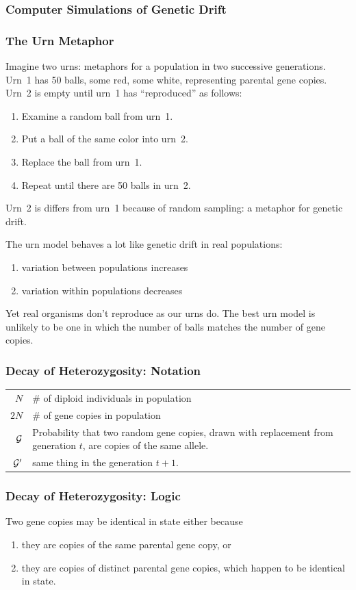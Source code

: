 \begin{frame}
\frametitle{Computer Simulations of Genetic Drift}

\end{frame}

\begin{frame}
\frametitle{The Urn Metaphor}

Imagine two urns: metaphors for a population in two successive
generations.  Urn~1 has 50 balls, some red, some white, representing
parental gene copies.  Urn~2 is empty until urn~1 has ``reproduced''
as follows:

\begin{enumerate}
\item Examine a random ball from urn~1.
\item Put a ball of the same color into urn~2.
\item Replace the ball from urn~1.
\item Repeat until there are 50 balls in urn~2.
\end{enumerate}
Urn~2 is differs from urn~1 because of random sampling: a metaphor for
genetic drift.
\end{frame}

\begin{frame}
The urn model behaves a lot like genetic drift in real populations:
\begin{enumerate}
\item variation between populations increases
\item variation within populations decreases
\end{enumerate}
Yet real organisms don't reproduce as our urns do.  The best urn model is
unlikely to be one in which the number of balls matches the number of
gene copies.
\end{frame}

\begin{frame}
\frametitle{Decay of Heterozygosity: Notation}
\begin{tabular}{r@{$\;=\;$}p{4in}}
$N$&\# of diploid individuals in population\\
$2N$&\# of gene copies in population\\
$\mathcal{G}$&Probability that two random gene copies, drawn with
  replacement from generation $t$, are copies of the same allele.\\
$\mathcal{G}'$&same thing in the generation $t+1$.
\end{tabular}
\end{frame}

\begin{frame}
\frametitle{Decay of Heterozygosity: Logic}
Two gene copies may be identical in state either because
\begin{enumerate}
\item they are copies of the same parental gene copy, or 
\item they are copies of distinct parental gene copies, which happen
  to be identical in state. 
\end{enumerate}
\end{frame}

